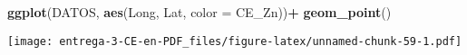 \documentclass[
]{article}
\newenvironment{Shaded}{\begin{snugshade}}{\end{snugshade}}
\newcommand{\DataTypeTok}[1]{\textcolor[rgb]{0.13,0.29,0.53}{#1}}
\newcommand{\DecValTok}[1]{\textcolor[rgb]{0.00,0.00,0.81}{#1}}
\newcommand{\KeywordTok}[1]{\textcolor[rgb]{0.13,0.29,0.53}{\textbf{#1}}}
\newcommand{\NormalTok}[1]{#1}
\newcommand{\OperatorTok}[1]{\textcolor[rgb]{0.81,0.36,0.00}{\textbf{#1}}}
\newcommand{\StringTok}[1]{\textcolor[rgb]{0.31,0.60,0.02}{#1}}
\begin{document}
\begin{Shaded}
\begin{Highlighting}[]
\KeywordTok{ggplot}\NormalTok{(DATOS, }\KeywordTok{aes}\NormalTok{(Long, Lat, }\DataTypeTok{color =}\NormalTok{ CE_Zn))}\OperatorTok{+}
\StringTok{  }\KeywordTok{geom_point}\NormalTok{()}
\end{Highlighting}
\end{Shaded}

\texttt{[image: entrega-3-CE-en-PDF\_files/figure-latex/unnamed-chunk-59-1.pdf]}

\begin{Shaded}
\end{Shaded}
\end{document}
